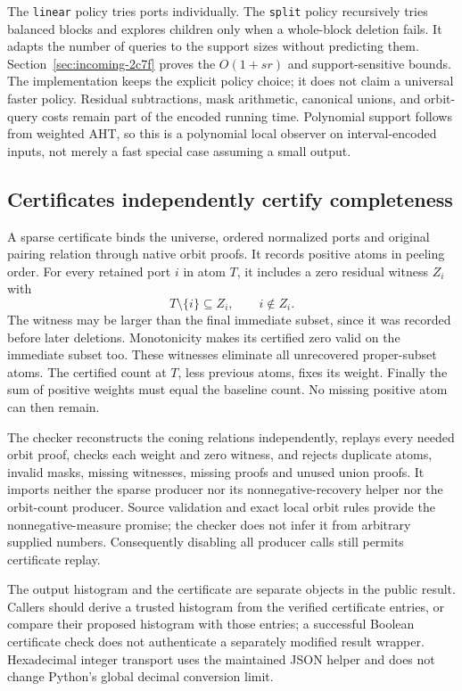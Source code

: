 The \texttt{linear} policy tries ports individually. The \texttt{split}
policy recursively tries balanced blocks and explores children only when a
whole-block deletion fails. It adapts the number of queries to the support
sizes without predicting them. Section~\ref{sec:incoming-2c7f} proves the
$O(1+sr)$ and support-sensitive bounds. The implementation keeps the explicit
policy choice; it does not claim a universal faster policy. Residual
subtractions, mask arithmetic, canonical unions, and orbit-query costs remain
part of the encoded running time. Polynomial support follows from weighted
AHT, so this is a polynomial local observer on interval-encoded inputs, not
merely a fast special case assuming a small output.

\subsection{Certificates independently certify completeness}

A sparse certificate binds the universe, ordered normalized ports and original
pairing relation through native orbit proofs. It records positive atoms in
peeling order. For every retained port $i$ in atom $T$, it includes a zero
residual witness $Z_i$ with
\[
 T\setminus\{i\}\subseteq Z_i,\qquad i\notin Z_i.
\]
The witness may be larger than the final immediate subset, since it was
recorded before later deletions. Monotonicity makes its certified zero valid
on the immediate subset too. These witnesses eliminate all unrecovered
proper-subset atoms. The certified count at $T$, less previous atoms, fixes
its weight. Finally the sum of positive weights must equal the baseline
count. No missing positive atom can then remain.

The checker reconstructs the coning relations independently, replays every
needed orbit proof, checks each weight and zero witness, and rejects duplicate
atoms, invalid masks, missing witnesses, missing proofs and unused union
proofs. It imports neither the sparse producer nor its nonnegative-recovery
helper nor the orbit-count producer. Source validation and exact local orbit
rules provide the nonnegative-measure promise; the checker does not infer it
from arbitrary supplied numbers. Consequently disabling all producer calls
still permits certificate replay.

The output histogram and the certificate are separate objects in the public
result. Callers should derive a trusted histogram from the verified certificate
entries, or compare their proposed histogram with those entries; a successful
Boolean certificate check does not authenticate a separately modified result
wrapper. Hexadecimal integer transport uses the maintained JSON helper and
does not change Python's global decimal conversion limit.

